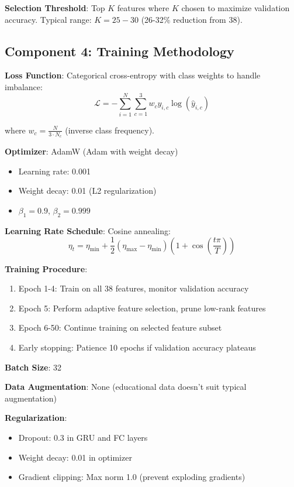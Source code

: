 \textbf{Selection Threshold}: Top $K$ features where $K$ chosen to maximize validation accuracy. Typical range: $K = 25-30$ (26-32\% reduction from 38).

\subsection{Component 4: Training Methodology}

\textbf{Loss Function}: Categorical cross-entropy with class weights to handle imbalance:
$$\mathcal{L} = -\sum_{i=1}^{N} \sum_{c=1}^{3} w_c y_{i,c} \log(\hat{y}_{i,c})$$

where $w_c = \frac{N}{3 \cdot N_c}$ (inverse class frequency).

\textbf{Optimizer}: AdamW (Adam with weight decay)
\begin{itemize}
\item Learning rate: 0.001
\item Weight decay: 0.01 (L2 regularization)
\item $\beta_1 = 0.9$, $\beta_2 = 0.999$
\end{itemize}

\textbf{Learning Rate Schedule}: Cosine annealing:
$$\eta_t = \eta_{\text{min}} + \frac{1}{2}(\eta_{\text{max}} - \eta_{\text{min}})(1 + \cos(\frac{t\pi}{T}))$$

\textbf{Training Procedure}:
\begin{enumerate}
\item Epoch 1-4: Train on all 38 features, monitor validation accuracy
\item Epoch 5: Perform adaptive feature selection, prune low-rank features
\item Epoch 6-50: Continue training on selected feature subset
\item Early stopping: Patience 10 epochs if validation accuracy plateaus
\end{enumerate}

\textbf{Batch Size}: 32

\textbf{Data Augmentation}: None (educational data doesn't suit typical augmentation)

\textbf{Regularization}:
\begin{itemize}
\item Dropout: 0.3 in GRU and FC layers
\item Weight decay: 0.01 in optimizer
\item Gradient clipping: Max norm 1.0 (prevent exploding gradients)
\end{itemize}

